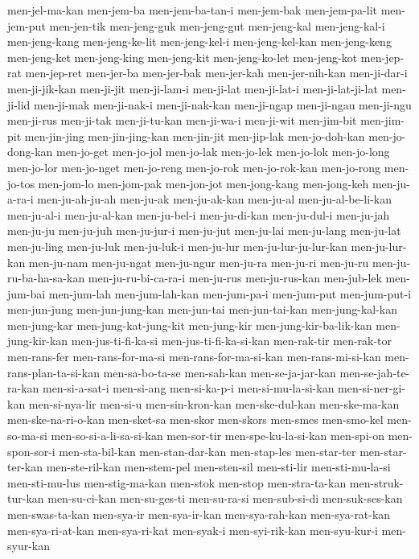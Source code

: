 {men-jel-ma-kan men-jem-ba men-jem-ba-tan-i men-jem-bak men-jem-pa-lit
men-jem-put men-jen-tik men-jeng-guk men-jeng-gut men-jeng-kal
men-jeng-kal-i men-jeng-kang men-jeng-ke-lit men-jeng-kel-i
men-jeng-kel-kan men-jeng-keng men-jeng-ket men-jeng-king men-jeng-kit
men-jeng-ko-let men-jeng-kot men-jep-rat men-jep-ret men-jer-ba
men-jer-bak men-jer-kah men-jer-nih-kan men-ji-dar-i men-ji-jik-kan
men-ji-jit men-ji-lam-i men-ji-lat men-ji-lat-i men-ji-lat-ji-lat
men-ji-lid men-ji-mak men-ji-nak-i men-ji-nak-kan men-ji-ngap men-ji-ngau
men-ji-ngu men-ji-rus men-ji-tak men-ji-tu-kan men-ji-wa-i men-ji-wit
men-jim-bit men-jim-pit men-jin-jing men-jin-jing-kan men-jin-jit
men-jip-lak men-jo-doh-kan men-jo-dong-kan men-jo-get men-jo-jol
men-jo-lak men-jo-lek men-jo-lok men-jo-long men-jo-lor men-jo-nget
men-jo-reng men-jo-rok men-jo-rok-kan men-jo-rong men-jo-tos men-jom-lo
men-jom-pak men-jon-jot men-jong-kang men-jong-keh men-ju-a-ra-i
men-ju-ah-ju-ah men-ju-ak men-ju-ak-kan men-ju-al men-ju-al-be-li-kan
men-ju-al-i men-ju-al-kan men-ju-bel-i men-ju-di-kan men-ju-dul-i
men-ju-jah men-ju-ju men-ju-juh men-ju-jur-i men-ju-jut men-ju-lai
men-ju-lang men-ju-lat men-ju-ling men-ju-luk men-ju-luk-i men-ju-lur
men-ju-lur-ju-lur-kan men-ju-lur-kan men-ju-nam men-ju-ngat men-ju-ngur
men-ju-ra men-ju-ri men-ju-ru men-ju-ru-ba-ha-sa-kan men-ju-ru-bi-ca-ra-i
men-ju-rus men-ju-rus-kan men-jub-lek men-jum-bai men-jum-lah
men-jum-lah-kan men-jum-pa-i men-jum-put men-jum-put-i men-jun-jung
men-jun-jung-kan men-jun-tai men-jun-tai-kan men-jung-kal-kan men-jung-kar
men-jung-kat-jung-kit men-jung-kir men-jung-kir-ba-lik-kan
men-jung-kir-kan men-jus-ti-fi-ka-si men-jus-ti-fi-ka-si-kan men-rak-tir
men-rak-tor men-rans-fer men-rans-for-ma-si men-rans-for-ma-si-kan
men-rans-mi-si-kan men-rans-plan-ta-si-kan men-sa-bo-ta-se men-sah-kan
men-se-ja-jar-kan men-se-jah-te-ra-kan men-si-a-sat-i men-si-ang
men-si-ka-p-i men-si-mu-la-si-kan men-si-ner-gi-kan men-si-nya-lir
men-si-u men-sin-kron-kan men-ske-dul-kan men-ske-ma-kan
men-ske-na-ri-o-kan men-sket-sa men-skor men-skors men-smes men-smo-kel
men-so-ma-si men-so-si-a-li-sa-si-kan men-sor-tir men-spe-ku-la-si-kan
men-spi-on men-spon-sor-i men-sta-bil-kan men-stan-dar-kan men-stap-les
men-star-ter men-star-ter-kan men-ste-ril-kan men-stem-pel men-sten-sil
men-sti-lir men-sti-mu-la-si men-sti-mu-lus men-stig-ma-kan men-stok
men-stop men-stra-ta-kan men-struk-tur-kan men-su-ci-kan men-su-ges-ti
men-su-ra-si men-sub-si-di men-suk-ses-kan men-swas-ta-kan men-sya-ir
men-sya-ir-kan men-sya-rah-kan men-sya-rat-kan men-sya-ri-at-kan
men-sya-ri-kat men-syak-i men-syi-rik-kan men-syu-kur-i men-syur-kan
}
